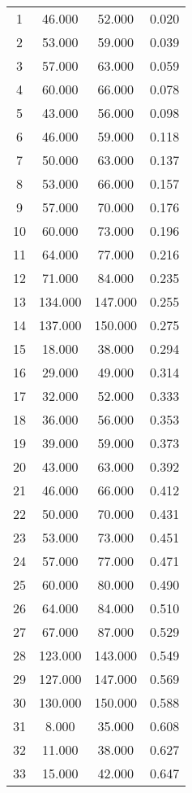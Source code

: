 % 
\begin{tabular}{cccc}
  \hline
  \hline
1 & 46.000 & 52.000 & 0.020 \\ 
  2 & 53.000 & 59.000 & 0.039 \\ 
  3 & 57.000 & 63.000 & 0.059 \\ 
  4 & 60.000 & 66.000 & 0.078 \\ 
  5 & 43.000 & 56.000 & 0.098 \\ 
  6 & 46.000 & 59.000 & 0.118 \\ 
  7 & 50.000 & 63.000 & 0.137 \\ 
  8 & 53.000 & 66.000 & 0.157 \\ 
  9 & 57.000 & 70.000 & 0.176 \\ 
  10 & 60.000 & 73.000 & 0.196 \\ 
  11 & 64.000 & 77.000 & 0.216 \\ 
  12 & 71.000 & 84.000 & 0.235 \\ 
  13 & 134.000 & 147.000 & 0.255 \\ 
  14 & 137.000 & 150.000 & 0.275 \\ 
  15 & 18.000 & 38.000 & 0.294 \\ 
  16 & 29.000 & 49.000 & 0.314 \\ 
  17 & 32.000 & 52.000 & 0.333 \\ 
  18 & 36.000 & 56.000 & 0.353 \\ 
  19 & 39.000 & 59.000 & 0.373 \\ 
  20 & 43.000 & 63.000 & 0.392 \\ 
  21 & 46.000 & 66.000 & 0.412 \\ 
  22 & 50.000 & 70.000 & 0.431 \\ 
  23 & 53.000 & 73.000 & 0.451 \\ 
  24 & 57.000 & 77.000 & 0.471 \\ 
  25 & 60.000 & 80.000 & 0.490 \\ 
  26 & 64.000 & 84.000 & 0.510 \\ 
  27 & 67.000 & 87.000 & 0.529 \\ 
  28 & 123.000 & 143.000 & 0.549 \\ 
  29 & 127.000 & 147.000 & 0.569 \\ 
  30 & 130.000 & 150.000 & 0.588 \\ 
  31 & 8.000 & 35.000 & 0.608 \\ 
  32 & 11.000 & 38.000 & 0.627 \\ 
  33 & 15.000 & 42.000 & 0.647 \\ 

\end{tabular}
